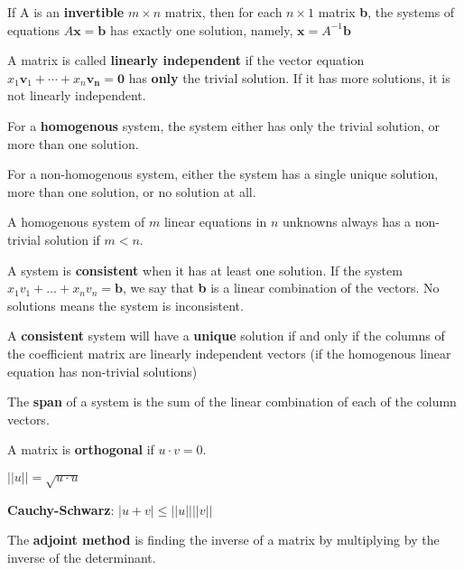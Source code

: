 \documentclass[11pt, letterpaper, twoside]{article}
\begin{document}
\vspace{2mm}
If A is an \textbf{invertible} \(m\times n\) matrix, then for each \(n\times1\) matrix \textbf{b}, the systems of equations \(A\textbf{x}=\textbf{b}\) has exactly one solution, namely, \(\textbf{x}=A^{-1}\textbf{b}\)

\vspace{2mm}
A matrix is called \textbf{linearly independent} if the vector equation \(x_1\mathbf{v}_1+\cdots+x_n\mathbf{v_n}=\mathbf{0}\) has \textbf{only} the trivial solution. If it has more solutions, it is not linearly independent.

\vspace{2mm}
For a \textbf{homogenous} system, the system either has only the trivial solution, or more than one solution.

\vspace{2mm}
For a non-homogenous system, either the system has a single unique solution, more than one solution, or no solution at all.

\vspace{2mm}
A homogenous system of \(m\) linear equations in \(n\) unknowns always has a non-trivial solution if \(m<n\).

\vspace{2mm}
A system is \textbf{consistent} when it has at least one solution. If the system \(x_1v_1+\dots + x_nv_n=\mathbf{b}\), we say that \textbf{b} is a linear combination of the vectors. No solutions means the system is inconsistent.

\vspace{2mm}
A \textbf{consistent} system will have a \textbf{unique} solution if and only if the columns of the coefficient matrix are linearly independent vectors (if the homogenous linear equation has non-trivial solutions)

\vspace{2mm}
The \textbf{span} of a system is the sum of the linear combination of each of the column vectors.

\vspace{2mm}
A matrix is \textbf{orthogonal} if \(u\cdot v=0\).

\vspace{2mm}
\(||u||=\sqrt{u\cdot u}\)

\vspace{2mm}
\textbf{Cauchy-Schwarz}: \(|u+v|\leq ||u|| ||v||\)

\vspace{2mm}
The \textbf{adjoint method} is finding the inverse of a matrix by multiplying by the inverse of the determinant.
\end{document}
